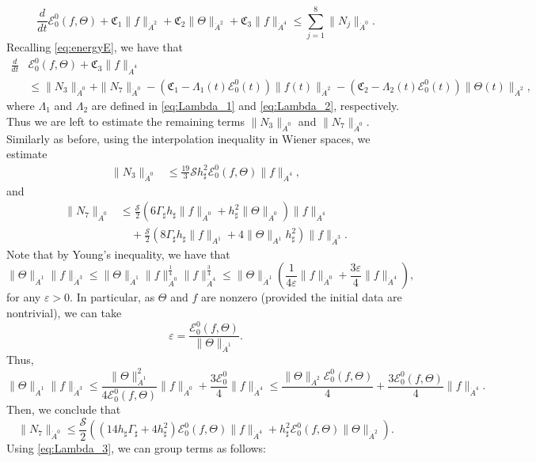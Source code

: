 \documentclass[reqno,11pt]{amsart}
\newcommand{\bh}{h_\sharp}
\newcommand{\bG}{\Gamma_\sharp}
\begin{document}
{$$
\frac{d}{dt}\mathscr{E}_0^0(f,\Theta)+\mathfrak{C}_1\|f\|_{\dot{A}^2}+\mathfrak{C}_2\|\Theta\|_{\dot{A}^2}+\mathfrak{C}_3\|f\|_{\dot{A}^4}\leq \sum_{j=1}^8\|N_j\|_{\dot A^0}.
$$
Recalling \eqref{eq:energyE}, we have that
\begin{align*}
\frac{d}{dt}&\mathscr{E}^0_0(f,\Theta)+\mathfrak{C}_3\|f\|_{\dot{A}^4}\\
&\leq \|N_3\|_{\dot A^0}+\|N_7\|_{\dot A^0} -\left(\mathfrak{C}_1-\Lambda_1(t)\mathscr{E}^0_0(t)\right)\|f(t)\|_{\dot{A}^2}-\left(\mathfrak{C}_2-\Lambda_2(t)\mathscr{E}^0_0(t)\right)\|\Theta(t)\|_{\dot{A}^2},
\end{align*}
where $\Lambda_1$ and $\Lambda_2$ are defined in \eqref{eq:Lambda_1} and \eqref{eq:Lambda_2}, respectively.
Thus we are left to estimate the remaining terms $\|N_3\|_{\dot A^0}$ and $\|N_7\|_{\dot A^0}$. Similarly as before, using the interpolation inequality in Wiener spaces, we estimate
\begin{align*}
\|N_3\|_{\dot A^0}&\leq \frac{19}{3}\mathcal{S}\bh^2\mathscr{E}_0^0(f,\Theta)\|f\|_{\dot{A}^4},
\end{align*}
and
\begin{align*}
\|N_7\|_{\dot A^0}&\leq \frac{\mathcal{S}}{2}\left(6\bG\bh \|f\|_{\dot A^0}+\bh^2\|\Theta\|_{\dot A^0}\right)\|f\|_{\dot{A}^4}\\
&\quad +\frac{\mathcal{S}}{2}\left(8\bG \bh \|f\|_{A^1}+4\|\Theta\|_{A^1}\bh^2\right)\|f\|_{\dot{A}^3}.
\end{align*}
Note that by Young's inequality, we have that
$$
\|\Theta\|_{\dot{A}^1}\|f\|_{\dot{A}^3}\leq \|\Theta\|_{\dot{A}^1}\|f\|_{\dot A^0}^{\frac{1}{4}}\|f\|_{\dot{A}^4}^{\frac{3}{4}}\leq\|\Theta\|_{\dot{A}^1}\left(\frac{1}{4\varepsilon}\|f\|_{\dot A^0}+\frac{3\varepsilon}{4}\|f\|_{\dot{A}^4}\right), 
$$
for any $\varepsilon>0$. In particular, as $\Theta$ and $f$ are nonzero (provided the initial data are nontrivial), we can take
$$
\varepsilon=\frac{\mathscr{E}_0^0(f,\Theta)}{\|\Theta\|_{\dot{A}^1}}.
$$
Thus,
$$
\|\Theta\|_{\dot{A}^1}\|f\|_{\dot{A}^3}\leq\frac{\|\Theta\|_{\dot{A}^1}^2}{4\mathscr{E}_0^0(f,\Theta)}\|f\|_{\dot A^0}+\frac{3\mathscr{E}_0^0}{4}\|f\|_{\dot{A}^4}\leq \frac{\|\Theta\|_{\dot{A}^2}\mathscr{E}_0^0(f,\Theta)}{4}+\frac{3\mathscr{E}_0^0(f,\Theta)}{4}\|f\|_{\dot{A}^4}. 
$$
Then, we conclude that
	\[
		\|N_7\|_{\dot A^0}\leq \frac{\mathcal{S}}{2}\left( (14\bh\bG +4\bh^2)\mathscr{E}_0^0(f,\Theta) \|f\|_{\dot A^4}+\bh^2\mathscr{E}_0^0(f,\Theta) \|\Theta\|_{\dot A^2}\right).
	\]
Using \eqref{eq:Lambda_3}, we can group terms as follows:
\begin{align*}

\end{align*}}
\end{document}
